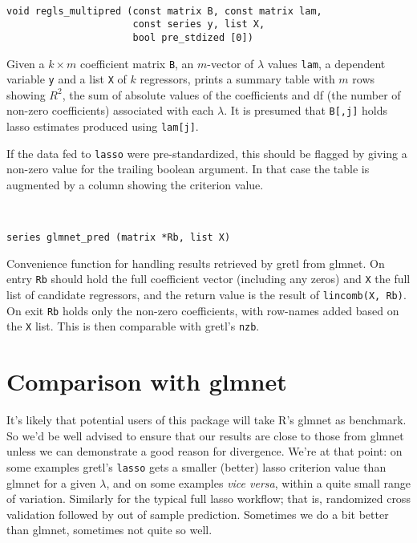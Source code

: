 \documentclass{article}
\newcommand{\startappendices}{%
\newcounter{appcount}
\setcounter{appcount}{0}
\renewcommand{\thesection}{Appendix \Alph{appcount}}}
\newcommand{\myappendix}[1]{%
\addtocounter{appcount}{1}
\section{#1}}
\newenvironment{funcdoc}
{\noindent\hrulefill\\[-12pt]}
{\medbreak}
\begin{document}
\begin{funcdoc}
\begin{verbatim}
void regls_multipred (const matrix B, const matrix lam,
                      const series y, list X,
                      bool pre_stdized [0])
\end{verbatim}
  Given a $k \times m$ coefficient matrix \texttt{B}, an $m$-vector of
  $\lambda$ values \texttt{lam}, a dependent variable \texttt{y} and a
  list \texttt{X} of $k$ regressors, prints a summary table with $m$
  rows showing $R^2$, the sum of absolute values of the coefficients
  and df (the number of non-zero coefficients) associated with each
  $\lambda$. It is presumed that \texttt{B[,j]} holds lasso estimates
  produced using \texttt{lam[j]}.

  If the data fed to \texttt{lasso} were pre-standardized, this should
  be flagged by giving a non-zero value for the trailing boolean
  argument. In that case the table is augmented by a column showing
  the criterion value.
\end{funcdoc}

\begin{funcdoc}
\begin{verbatim}
series glmnet_pred (matrix *Rb, list X)
\end{verbatim}
  Convenience function for handling results retrieved by gretl from
  \textsf{glmnet}. On entry \texttt{Rb} should hold the full
  coefficient vector (including any zeros) and \texttt{X} the full
  list of candidate regressors, and the return value is the result of
  \texttt{lincomb(X, Rb)}. On exit \texttt{Rb} holds only the non-zero
  coefficients, with row-names added based on the \texttt{X}
  list. This is then comparable with gretl's \texttt{nzb}.
\end{funcdoc}




\clearpage
\startappendices

\myappendix{Comparison with glmnet}
\label{sec:comparison}

It's likely that potential users of this package will take
\textsf{R}'s \textsf{glmnet} as benchmark. So we'd be well advised to
ensure that our results are close to those from \textsf{glmnet} unless
we can demonstrate a good reason for divergence. We're at that point:
on some examples gretl's \texttt{lasso} gets a smaller (better) lasso
criterion value than \textsf{glmnet} for a given $\lambda$, and on
some examples \textit{vice versa}, within a quite small range of
variation. Similarly for the typical full \textsf{lasso} workflow;
that is, randomized cross validation followed by out of sample
prediction. Sometimes we do a bit better than \textsf{glmnet},
sometimes not quite so well.
\end{document}
